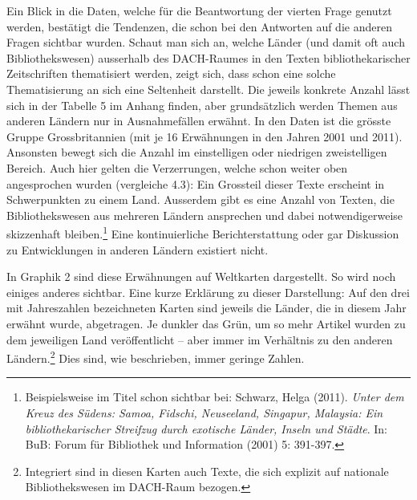 \documentclass[a4paper,
fontsize=11pt,
oneside,
numbers=noperiodatend,
parskip=half-,
bibliography=totoc,
final
]{scrartcl}
\begin{document}
Ein Blick in die Daten, welche für die Beantwortung der vierten Frage
genutzt werden, bestätigt die Tendenzen, die schon bei den Antworten auf
die anderen Fragen sichtbar wurden. Schaut man sich an, welche Länder
(und damit oft auch Bibliothekswesen) ausserhalb des DACH-Raumes in den
Texten bibliothekarischer Zeitschriften thematisiert werden, zeigt sich,
dass \linebreak schon eine solche Thematisierung an sich eine Seltenheit darstellt.
Die jeweils konkrete Anzahl lässt sich in der Tabelle 5 im Anhang
finden, aber grundsätzlich werden Themen aus anderen Ländern nur in
Ausnahmefällen erwähnt. In den Daten ist die grösste Gruppe
Grossbritannien (mit je 16 Erwähnungen in den Jahren 2001 und 2011).
Ansonsten bewegt sich die Anzahl im einstelligen oder niedrigen
zweistelligen Bereich. Auch hier gelten die Verzerrungen, welche schon
weiter oben angesprochen wurden (vergleiche 4.3): Ein Grossteil dieser
Texte erscheint in Schwerpunkten zu einem Land. Ausserdem gibt es eine
Anzahl von Texten, die Bibliothekswesen aus mehreren Ländern ansprechen
und dabei notwendigerweise skizzenhaft bleiben.\footnote{Beispielsweise
  im Titel schon sichtbar bei: Schwarz, Helga (2011). \emph{Unter dem
  Kreuz des Südens: Samoa, Fidschi, Neuseeland, Singapur, Malaysia: Ein
  bibliothekarischer Streifzug durch exotische Länder, Inseln und
  Städte}. In: BuB: Forum für Bibliothek und Information (2001) 5:
  391-397.} Eine kontinuierliche Berichterstattung oder gar Diskussion
zu Entwicklungen in anderen Ländern existiert nicht.

In Graphik 2 sind diese Erwähnungen auf Weltkarten dargestellt. So wird
noch einiges anderes sichtbar. Eine kurze Erklärung zu dieser
Darstellung: Auf den drei mit Jahreszahlen bezeichneten Karten sind
jeweils die Länder, die in diesem Jahr erwähnt wurde, abgetragen. Je
dunkler das Grün, um so mehr Artikel wurden zu dem jeweiligen Land
veröffentlicht -- aber immer im Verhältnis zu den anderen
Ländern.\footnote{Integriert sind in diesen Karten auch Texte, die sich
  explizit auf nationale Bibliothekswesen im DACH-Raum bezogen.} Dies
sind, wie beschrieben, immer geringe Zahlen.
\end{document}
